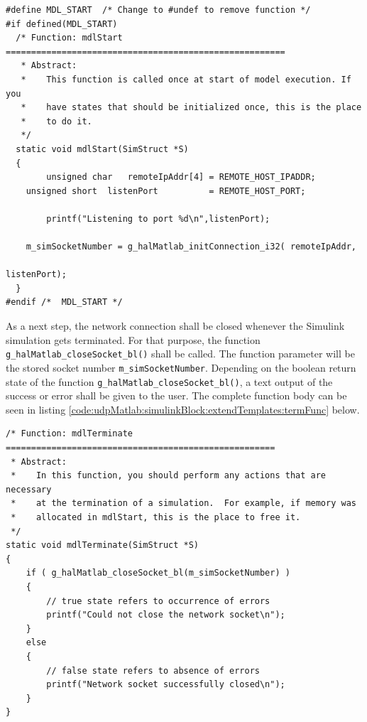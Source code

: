\begin{lstlisting}[caption={[\texttt{myUdpSource.c} extended by start function code]C-Code template file 'myUdpSource.c' extended by the function body of the \texttt{mdlStart} function (code snippet of listing \ref{code:c-sFunc-Code:rawTemplate}, lines 265 ll.)},label=code:udpMatlab:simulinkBlock:extendTemplates:startFunc,firstnumber=265]
#define MDL_START  /* Change to #undef to remove function */
#if defined(MDL_START) 
  /* Function: mdlStart =======================================================
   * Abstract:
   *    This function is called once at start of model execution. If you
   *    have states that should be initialized once, this is the place
   *    to do it.
   */
  static void mdlStart(SimStruct *S)
  {
		unsigned char 	remoteIpAddr[4] = REMOTE_HOST_IPADDR;
    unsigned short 	listenPort 			= REMOTE_HOST_PORT;
    
		printf("Listening to port %d\n",listenPort);
	  
    m_simSocketNumber = g_halMatlab_initConnection_i32( remoteIpAddr,
																												listenPort);
  }
#endif /*  MDL_START */
\end{lstlisting}

As a next step, the network connection shall be closed whenever the Simulink simulation gets terminated. For that purpose, the function \texttt{g\_halMatlab\_closeSocket\_bl()} shall be called. The function parameter will be the stored socket number \texttt{m\_simSocketNumber}. Depending on the boolean return state of the function \texttt{g\_halMatlab\_closeSocket\_bl()}, a text output of the success or error shall be given to the user. The complete function body can be seen in listing \ref{code:udpMatlab:simulinkBlock:extendTemplates:termFunc} below.

\begin{lstlisting}[caption={[\texttt{myUdpSource.c} extended by terminate function code]C-Code template file 'myUdpSource.c' extended by the function body of the \texttt{mdlTerminate} function (code snippet of listing \ref{code:c-sFunc-Code:rawTemplate}, lines 307 ll.)},label=code:udpMatlab:simulinkBlock:extendTemplates:termFunc,firstnumber=307]
/* Function: mdlTerminate =====================================================
 * Abstract:
 *    In this function, you should perform any actions that are necessary
 *    at the termination of a simulation.  For example, if memory was
 *    allocated in mdlStart, this is the place to free it.
 */
static void mdlTerminate(SimStruct *S)
{
	if ( g_halMatlab_closeSocket_bl(m_simSocketNumber) )
	{
		// true state refers to occurrence of errors
		printf("Could not close the network socket\n");
	}
	else
	{
		// false state refers to absence of errors
		printf("Network socket successfully closed\n");
	}
}
\end{lstlisting}

